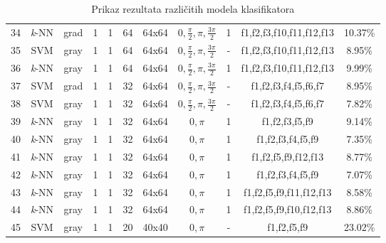 \documentclass[times, utf8, zavrsni, numeric]{fer}
\begin{document}
\begin{table}[ht]
\begin{adjustwidth}{-30pt}{0pt}
\begin{tabular}{c|c|c|c|c|c|c|c|c|c|c}
34 & \textit{k}-NN & grad & 1 & 1 & 64 & 64x64 & \(0, \frac{\pi}{2}, \pi, \frac{3\pi}{2}\) & 1 & f1,f2,f3,f10,f11,f12,f13 & 10.37\% \\
35 & SVM & gray & 1 & 1 & 64 & 64x64 & \(0, \frac{\pi}{2}, \pi, \frac{3\pi}{2}\) & - & f1,f2,f3,f10,f11,f12,f13 & 8.95\% \\
36 & \textit{k}-NN & gray & 1 & 1 & 64 & 64x64 & \(0, \frac{\pi}{2}, \pi, \frac{3\pi}{2}\) & 1 & f1,f2,f3,f10,f11,f12,f13 & 9.99\% \\
37 & SVM & grad & 1 & 1 & 32 & 64x64 & \(0, \frac{\pi}{2}, \pi, \frac{3\pi}{2}\) & - & f1,f2,f3,f4,f5,f6,f7 & 8.95\% \\
38 & SVM & gray & 1 & 1 & 32 & 64x64 & \(0, \frac{\pi}{2}, \pi, \frac{3\pi}{2}\) & - & f1,f2,f3,f4,f5,f6,f7 & 7.82\% \\
39 & \textit{k}-NN & gray & 1 & 1 & 32 & 64x64 & \(0, \pi\) & 1 & f1,f2,f3,f5,f9 & 9.14\% \\
40 & \textit{k}-NN & gray & 1 & 1 & 32 & 64x64 & \(0, \pi\) & 1 & f1,f2,f3,f4,f5,f9 & 7.35\% \\
41 & \textit{k}-NN & gray & 1 & 1 & 32 & 64x64 & \(0, \pi\) & 1 & f1,f2,f5,f9,f12,f13 & 8.77\% \\
42 & \textit{k}-NN & gray & 1 & 1 & 32 & 64x64 & \(0, \pi\) & 1 & f1,f2,f3,f4,f5,f9 & 7.07\% \\
43 & \textit{k}-NN & gray & 1 & 1 & 32 & 64x64 & \(0, \pi\) & 1 & f1,f2,f5,f9,f11,f12,f13 & 8.58\% \\
44 & \textit{k}-NN & gray & 1 & 1 & 32 & 64x64 & \(0, \pi\) & 1 & f1,f2,f5,f9,f10,f12,f13 & 8.86\% \\
45 & SVM & gray & 1 & 1 & 20 & 40x40 & \(0, \pi\) & - & f1,f2,f5,f9 & 23.02\% \\
\end{tabular}
\end{adjustwidth}
\caption{Prikaz rezultata različitih modela klasifikatora} 
\end{table}
\end{document}
